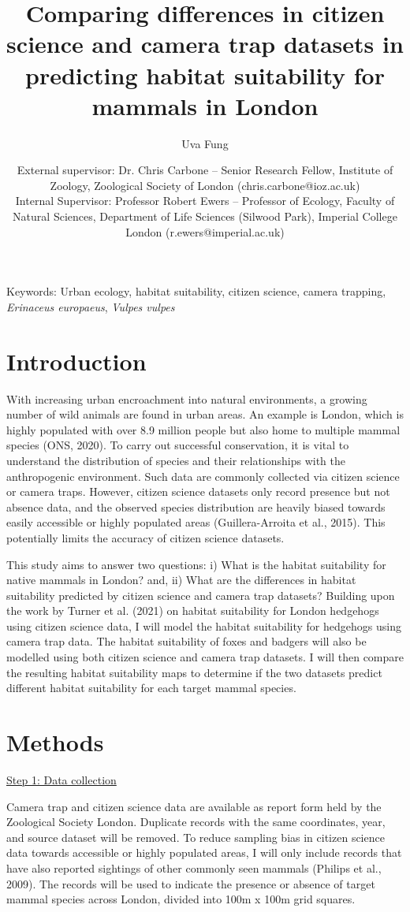 \documentclass[11pt, a4paper]{article}
\title{Comparing differences in citizen science and camera trap datasets in predicting habitat suitability for mammals in London}
\author{Uva Fung}
\date{%
    External supervisor: Dr. Chris Carbone -- Senior Research Fellow, Institute of Zoology, Zoological Society of London (chris.carbone@ioz.ac.uk)\\%
    Internal Supervisor: Professor Robert Ewers -- Professor of Ecology, Faculty of Natural Sciences, Department of Life Sciences (Silwood Park), Imperial College London (r.ewers@imperial.ac.uk)\\[2ex]%
}
\begin{document}
  \maketitle
\newpage


Keywords: Urban ecology, habitat suitability, citizen science, camera trapping, \textit{Erinaceus europaeus}, \textit{Vulpes vulpes}

\section{Introduction}
With increasing urban encroachment into natural environments, a growing number of wild animals are found in urban areas. An example is London, which is highly populated with over 8.9 million people but also home to multiple mammal species (ONS, 2020). To carry out successful conservation, it is vital to understand the distribution of species and their relationships with the anthropogenic environment. Such data are commonly collected via citizen science or camera traps. However, citizen science datasets only record presence but not absence data, and the observed species distribution are heavily biased towards easily accessible or highly populated areas (Guillera-Arroita et al., 2015). This potentially limits the accuracy of citizen science datasets. 

This study aims to answer two questions: i) What is the habitat suitability for native mammals in London? and, ii) What are the differences in habitat suitability predicted by citizen science and camera trap datasets? Building upon the work by Turner et al. (2021) on habitat suitability for London hedgehogs using citizen science data, I will model the habitat suitability for hedgehogs using camera trap data. The habitat suitability of foxes and badgers will also be modelled using both citizen science and camera trap datasets. I will then compare the resulting habitat suitability maps to determine if the two datasets predict different habitat suitability for each target mammal species. 


\section{Methods}

\underline{Step 1: Data collection} 

Camera trap and citizen science data are available as report form held by the Zoological Society London. Duplicate records with the same coordinates, year, and source dataset will be removed. To reduce sampling bias in citizen science data towards accessible or highly populated areas, I will only include records that have also reported sightings of other commonly seen mammals (Philips et al., 2009). The records will be used to indicate the presence or absence of target mammal species across London, divided into 100m x 100m grid squares. 
\vspace{\baselineskip}
\end{document}
